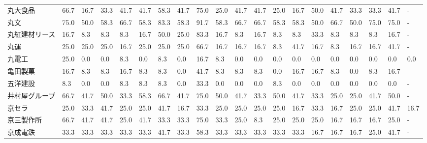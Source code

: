 \documentclass[a4paper，11pt]{jsarticle}
\begin{document}
\begin{longtable}[c]{lp{3mm}p{3mm}p{3mm}p{3mm}p{3mm}p{3mm}p{3mm}p{3mm}p{3mm}p{3mm}p{3mm}p{3mm}p{3mm}p{3mm}p{3mm}p{3mm}p{3mm}p{3mm}p{3mm}}
丸大食品            &   66.7 &   16.7 &      33.3 &      41.7 &       41.7 &   58.3 &   41.7 &   75.0 &    25.0 &    41.7 &   41.7 &  25.0 &   16.7 &    50.0 &    41.7 &  33.3 &  33.3 &  41.7 &     - \\
丸文              &   75.0 &   50.0 &      58.3 &      66.7 &       58.3 &   83.3 &   58.3 &   91.7 &    58.3 &    66.7 &   66.7 &  58.3 &   58.3 &    50.0 &    66.7 &  50.0 &  75.0 &  75.0 &     - \\
丸紅建材リース         &   16.7 &    8.3 &       8.3 &       8.3 &       16.7 &   50.0 &   25.0 &   83.3 &    16.7 &     8.3 &   16.7 &   8.3 &    8.3 &    33.3 &     8.3 &   8.3 &   8.3 &  16.7 &     - \\
丸運              &   25.0 &   25.0 &      25.0 &      16.7 &       25.0 &   25.0 &   25.0 &   66.7 &    16.7 &    16.7 &   16.7 &   8.3 &   41.7 &    16.7 &     8.3 &  16.7 &  16.7 &  41.7 &     - \\
九電工             &   25.0 &    0.0 &       0.0 &       8.3 &        0.0 &    8.3 &    0.0 &   16.7 &     8.3 &     0.0 &    0.0 &   0.0 &    0.0 &     0.0 &     0.0 &   0.0 &   0.0 &   0.0 &   0.0 \\
亀田製菓            &   16.7 &    8.3 &       8.3 &      16.7 &        8.3 &    8.3 &    0.0 &   41.7 &     8.3 &     8.3 &    8.3 &   0.0 &   16.7 &    16.7 &     8.3 &   0.0 &   8.3 &  16.7 &     - \\
五洋建設            &    8.3 &    0.0 &       0.0 &       8.3 &        8.3 &    8.3 &    0.0 &   33.3 &     0.0 &     0.0 &    0.0 &   8.3 &    0.0 &     0.0 &     0.0 &   0.0 &   0.0 &   0.0 &     - \\
井村屋グループ         &   66.7 &   41.7 &      50.0 &      33.3 &       58.3 &   66.7 &   41.7 &   75.0 &    50.0 &    41.7 &   33.3 &  50.0 &   41.7 &    33.3 &    25.0 &  25.0 &  41.7 &  50.0 &     - \\
京セラ             &   25.0 &   33.3 &      41.7 &      25.0 &       25.0 &   41.7 &   16.7 &   33.3 &    25.0 &    25.0 &   25.0 &  25.0 &   16.7 &    33.3 &    16.7 &  25.0 &  25.0 &  41.7 &  16.7 \\
京三製作所           &   66.7 &   41.7 &      41.7 &      25.0 &       41.7 &   33.3 &   33.3 &   75.0 &    33.3 &    25.0 &    8.3 &  25.0 &   25.0 &    25.0 &    16.7 &  16.7 &  16.7 &  25.0 &     - \\
京成電鉄            &   33.3 &   33.3 &      33.3 &      33.3 &       33.3 &   41.7 &   33.3 &   58.3 &    33.3 &    33.3 &   33.3 &  33.3 &   33.3 &    16.7 &    16.7 &  16.7 &  25.0 &  41.7 &     - \\

\end{longtable}
\end{document}
